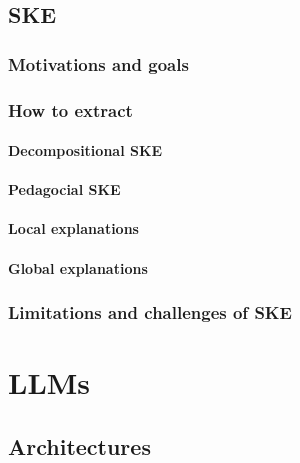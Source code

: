 \documentclass[12pt,a4paper,openright,twoside]{book}
\begin{document}
\section{\Acl{SKE}}\label{sec:ske}

\subsection{Motivations and goals}\label{subsec:ske-motivations-and-goals}

\subsection{How to extract}\label{subsec:how-to-extract}

\subsubsection{Decompositional \ac{SKE}}\label{subsubsec:decompositional-ske}

\subsubsection{Pedagocial \ac{SKE}}\label{subsubsec:pedagogical-ske}

\subsubsection{Local explanations}\label{subsubsec:local-explanations}

\subsubsection{Global explanations}\label{subsubsec:global-explanations}

\subsection{Limitations and challenges of \ac{SKE}}\label{subsec:limitations-and-challenges-of-ske}


\chapter{\Aclp{LLM}}\label{ch:llm}

\section{Architectures}\label{sec:llm-architectures}
\end{document}
